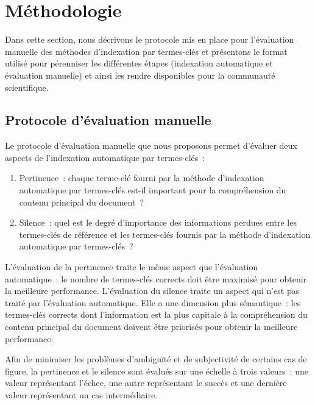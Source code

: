 
  \section{Méthodologie}
  \label{section:main-automatic_evaluation_of_keyphrase_annotation-methodology}
    Dans cette section, nous décrivons le protocole mis en place pour
    l'évaluation manuelle des méthodes d'indexation par termes-clés et
    présentons le format utilisé pour pérenniser les différentes étapes
    (indexation automatique et évaluation manuelle) et ainsi les rendre
    disponibles pour la communauté scientifique.

    \subsection{Protocole d'évaluation manuelle}
    \label{subsec:main-automatic_evaluation_of_keyphrase_annotation-methodology-evaluation_protocol}
      Le protocole d'évaluation manuelle que nous proposons permet d'évaluer
      deux aspects de l'indexation automatique par termes-clés~:
      \begin{enumerate}
        \item{Pertinence~: chaque terme-clé fourni par la méthode d'indexation
              automatique par termes-clés est-il important pour la compréhension
              du contenu principal du document~?}
        \item{Silence~: quel est le degré d'importance des informations perdues
              entre les termes-clés de référence et les termes-clés fournis par
              la méthode d'indexation automatique par termes-clés~?}
      \end{enumerate}
      L'évaluation de la pertinence traite le même aspect que l'évaluation
      automatique~: le nombre de termes-clés corrects doit être maximisé pour
      obtenir la meilleure performance. L'évaluation du silence traite un aspect
      qui n'est pas traité par l'évaluation automatique. Elle a une dimension
      plus sémantique~: les termes-clés corrects dont l'information est la plus
      capitale à la compréhension du contenu principal du document doivent être
      priorisés pour obtenir la meilleure performance.

      Afin de minimiser les problèmes d'ambiguïté et de subjectivité de certains
      cas de figure, la pertinence et le silence sont évalués sur une échelle à
      trois valeurs~: une valeur représentant l'échec, une autre représentant le
      succès et une dernière valeur représentant un cas intermédiaire.

